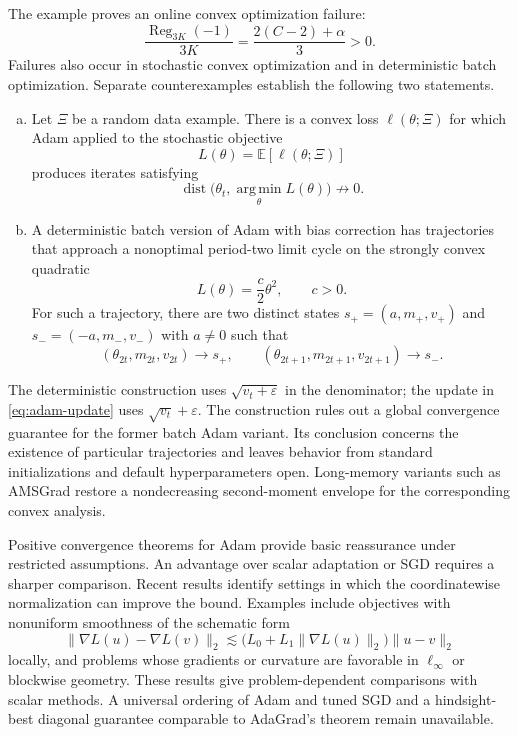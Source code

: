 \documentclass[11pt,twoside]{article}
\newcommand{\E}{\mathbb E}
\newcommand{\argmin}{\operatorname*{arg\,min}}
\theoremstyle{definition}
\theoremstyle{remark}
\begin{document}
The example proves an online convex optimization failure:
\begin{equation}
 \frac{\operatorname{Reg}_{3K}(-1)}{3K}
 =\frac{2(C-2)+\alpha}{3}>0.
 \label{eq:adam-nonvanishing-average-regret}
\end{equation}
Failures also occur in stochastic convex optimization and in deterministic
batch optimization. Separate counterexamples establish the following two
statements.
\begin{enumerate}[(a),leftmargin=*]
\item Let $\Xi$ be a random data example. There is a convex loss
$\ell(\theta;\Xi)$ for which Adam applied to the stochastic objective
\begin{equation}
 L(\theta)=\E[\ell(\theta;\Xi)]
 \label{eq:adam-stochastic-objective}
\end{equation}
produces iterates satisfying
\begin{equation}
 \operatorname{dist}\bigl(\theta_t,\argmin_\theta L(\theta)\bigr)
 \not\longrightarrow0.
 \label{eq:adam-stochastic-nonconvergence}
\end{equation}
\item A deterministic batch version of Adam with bias correction has
trajectories that approach a nonoptimal period-two limit cycle on the strongly
convex quadratic
\begin{equation}
 L(\theta)=\frac c2\theta^2,
 \qquad c>0.
 \label{eq:adam-quadratic-objective}
\end{equation}
For such a trajectory, there are two distinct states
$s_+=(a,m_+,v_+)$ and $s_-=(-a,m_-,v_-)$ with $a\ne0$ such that
\begin{equation}
 (\theta_{2t},m_{2t},v_{2t})\longrightarrow s_+,
 \qquad
 (\theta_{2t+1},m_{2t+1},v_{2t+1})\longrightarrow s_-.
 \label{eq:adam-two-cycle}
\end{equation}
\end{enumerate}
The deterministic construction uses $\sqrt{v_t+\varepsilon}$ in the
denominator; the update in \cref{eq:adam-update} uses
$\sqrt{v_t}+\varepsilon$. The construction rules out a global convergence
guarantee for the former batch Adam variant. Its conclusion concerns the
existence of particular trajectories and leaves behavior from standard
initializations and default hyperparameters open. Long-memory variants such
as AMSGrad restore a nondecreasing second-moment envelope for the corresponding
convex analysis.

Positive convergence theorems for Adam provide basic reassurance under
restricted assumptions. An advantage over scalar adaptation or SGD requires
a sharper comparison. Recent results identify settings in which the
coordinatewise normalization can improve the bound. Examples
include objectives with nonuniform smoothness of the schematic form
\[
 \|\nabla L(u)-\nabla L(v)\|_2
 \lesssim
 \bigl(L_0+L_1\|\nabla L(u)\|_2\bigr)
 \|u-v\|_2
\]
locally, and problems whose gradients or curvature are favorable in
$\ell_\infty$ or blockwise geometry. These results give problem-dependent
comparisons with scalar methods. A universal ordering of Adam and tuned SGD
and a hindsight-best diagonal guarantee comparable to AdaGrad's theorem
remain unavailable.
\end{document}
